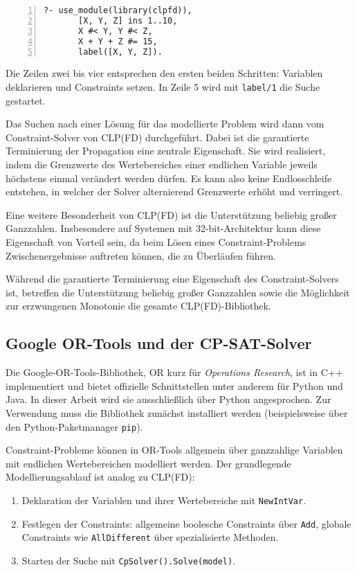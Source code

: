 \documentclass[12pt,a4paper]{article}
\begin{document}
\begin{Verbatim}[numbers=left, xleftmargin=5mm, frame=lines]
    ?- use_module(library(clpfd)),
       [X, Y, Z] ins 1..10,
       X #< Y, Y #< Z,
       X + Y + Z #= 15,
       label([X, Y, Z]).
\end{Verbatim}

\noindent
Die Zeilen zwei bis vier entsprechen den ersten beiden Schritten: Variablen deklarieren und Constraints setzen.
In Zeile 5 wird mit \texttt{label/1} die Suche gestartet. 

Das Suchen nach einer Lösung für das modellierte Problem wird dann vom Constraint-Solver von CLP(FD) durchgeführt.
Dabei ist die garantierte Terminierung der Propagation eine zentrale Eigenschaft. Sie wird realisiert, indem die Grenzwerte des Wertebereiches einer endlichen Variable jeweils höchstens einmal verändert werden dürfen. 
Es kann also keine Endlosschleife entstehen, in welcher der Solver alternierend Grenzwerte erhöht und verringert.

Eine weitere Besonderheit von CLP(FD) ist die Unterstützung beliebig großer Ganzzahlen.
Insbesondere auf Systemen mit 32-bit-Architektur kann diese Eigenschaft von Vorteil sein, da beim Lösen eines Constraint-Problems Zwischenergebnisse auftreten können, die zu Überläufen führen.

Während die garantierte Terminierung eine Eigenschaft des Constraint-Solvers ist, betreffen die Unterstützung beliebig großer Ganzzahlen sowie die Möglichkeit zur erzwungenen Monotonie die gesamte CLP(FD)-Bibliothek.

\subsection{Google OR-Tools und der CP-SAT-Solver}
\label{sec:ortools}
Die Google-OR-Tools-Bibliothek, \glqq OR\grqq{} kurz für \emph{Operations Research}, ist in C++ implementiert und bietet offizielle Schnittstellen unter anderem für Python und Java.
In dieser Arbeit wird sie ausschließlich über Python angesprochen.
Zur Verwendung muss die Bibliothek zunächst installiert werden (beispielsweise über den Python-Paketmanager \texttt{pip}).

Constraint-Probleme können in OR-Tools allgemein über ganzzahlige Variablen mit endlichen Wertebereichen modelliert werden.
Der grundlegende Modellierungsablauf ist analog zu CLP(FD):

\begin{enumerate}
    \item Deklaration der Variablen und ihrer Wertebereiche mit \texttt{NewIntVar}.
    \item Festlegen der Constraints: allgemeine boolesche Constraints über \texttt{Add}, globale Constraints wie \texttt{AllDifferent} über spezialisierte Methoden.
    \item Starten der Suche mit \texttt{CpSolver().Solve(model)}.
\end{enumerate}
\end{document}
